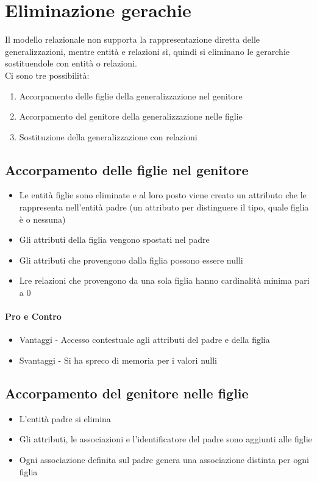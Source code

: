 \section{Eliminazione gerachie}
Il modello relazionale non supporta la rappresentazione diretta delle generalizzazioni,
mentre entità e relazioni sì, quindi si eliminano le gerarchie sostituendole con 
entità o relazioni.\\
Ci sono tre possibilità:
\begin{enumerate}
    \item Accorpamento delle figlie della generalizzazione nel genitore
    \item Accorpamento del genitore della generalizzazione nelle figlie
    \item Sostituzione della generalizzazione con relazioni
\end{enumerate}
\subsection{Accorpamento delle figlie nel genitore}
\begin{itemize}
    \item Le entità figlie sono eliminate e al loro posto viene creato un attributo che le rappresenta
    nell'entità padre (un attributo per distinguere il tipo, quale figlia è o nessuna)
    \item Gli attributi della figlia vengono spostati nel padre
    \item Gli attributi che  provengono dalla figlia possono essere nulli
    \item Lre relazioni che provengono da una sola figlia hanno cardinalità minima pari a 0
\end{itemize}
\paragraph*{Pro e Contro}
\begin{itemize}
    \item Vantaggi - Accesso contestuale agli attributi del padre e della figlia
    \item Svantaggi - Si ha spreco di memoria per i valori nulli
\end{itemize}
\subsection{Accorpamento del genitore nelle figlie}
\begin{itemize}
    \item L'entità padre si elimina 
    \item Gli attributi, le associazioni e l'identificatore del padre sono aggiunti alle figlie
    \item Ogni associazione definita sul padre genera una associazione distinta per ogni figlia
\end{itemize}
